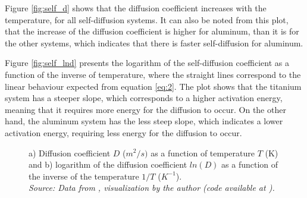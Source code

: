 Figure \ref{fig:self_d} shows that the diffusion coefficient increases with the temperature, for all self-diffusion systems. It can also be noted from this plot, that the increase of the diffusion coefficient is higher for aluminum, than it is for the other systems, which indicates that there is faster self-diffusion for aluminum.

Figure \ref{fig:self_lnd} presents the logarithm of the self-diffusion coefficient as a function of the inverse of temperature, where the straight lines correspond to the linear behaviour expected from equation \ref{eq:2}. The plot shows that the titanium system has a steeper slope, which corresponds to a higher activation energy, meaning that it requires more energy for the diffusion to occur. On the other hand, the aluminum system has the less steep slope, which indicates a lower activation energy, requiring less energy for the diffusion to occur.

\begin{figure}[h]
 \centering
 \captionsetup{justification=centering}
 \caption{a) Diffusion coefficient $D$ ($m^2/s)$ as a function of temperature $T$ (K) and b) logarithm of the diffusion coefficient $ln(D)$ as a function of the inverse of the temperature $1/T$ ($K^{-1}$). \\
 \textit{Source: Data from \citep{kakusan}, visualization by the author (code available at \citep{mygit}).}}
 \label{fig:self_diffusion}
\end{figure}

